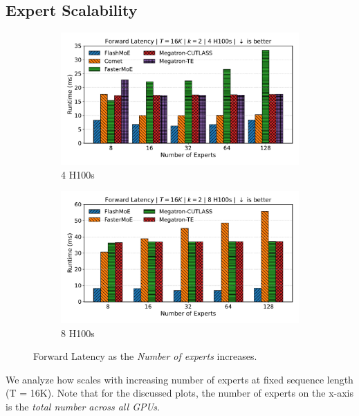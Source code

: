 \subsection{Expert Scalability}\label{subsec:expert-scalability}
\begin{figure}[!h]
    \centering
    \begin{subfigure}{0.49\textwidth}
        \centering
        \includegraphics[width=\linewidth, keepaspectratio]{flash_figs/scaling_experts}
        \caption{4 H100s}
        \label{sub:4gx}
    \end{subfigure}
    \begin{subfigure}{0.49\textwidth}
        \centering
        \includegraphics[width=\linewidth, keepaspectratio]{flash_figs/scaling_experts_8}
        \caption{8 H100s}
        \label{sub:8gx}
    \end{subfigure}
    \caption{Forward Latency as the \emph{Number of experts} increases.}
    \label{fig:xs}
\end{figure}
We analyze how \sysname scales with increasing number of experts at fixed sequence length (T = 16K).
Note that for the discussed plots, the number of experts on the x-axis is the \emph{total number across all GPUs}.
